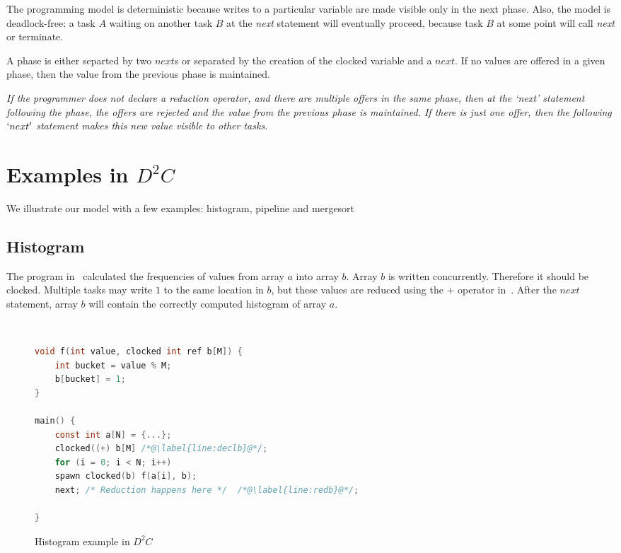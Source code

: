 \documentclass[10pt, conference, compsocconf]{IEEEtran}
\begin{document}
\begin{lstlisting}

\end{lstlisting}

The programming model is deterministic because writes to a particular variable
are made visible only in the next phase. Also, the model is deadlock-free: a task $A$ waiting on another task $B$ at the \emph{next} statement will eventually
proceed, because task $B$ at some point will call \emph{next} or terminate.

A phase is either separted by two $next$s or separated
by the creation of the clocked variable and a $next$.
If no values are offered in a given phase, then the value from
the previous phase is maintained.

{\it If the programmer does not declare a reduction operator, and there are multiple offers in the same phase, then  at the `next' statement following
the phase, the offers are rejected and the value from
the previous phase is maintained. If there is just one offer, then the following $`next'$ statement makes this new value visible to other tasks.}


\section{Examples in $D^2C$}
\label{sec:examples}
We illustrate our model with a few examples: 
histogram, pipeline and mergesort

\subsection{Histogram}
The program in~ calculated the frequencies
of values from array $a$ 
into array $b$.
Array $b$ is written concurrently. Therefore it should be clocked.
Multiple tasks may write $1$ to the same location in $b$, but these
values are reduced using the $+$ operator in~. After the 
$next$ statement, array $b$ will contain the correctly computed histogram
of array $a$. 

\
\begin{figure}
\begin{lstlisting}[language=C]
void f(int value, clocked int ref b[M]) {
    int bucket = value % M;
    b[bucket] = 1; 
}

main() {
    const int a[N] = {...};
    clocked((+) b[M] /*@\label{line:declb}@*/;
    for (i = 0; i < N; i++)
	spawn clocked(b) f(a[i], b); 
    next; /* Reduction happens here */  /*@\label{line:redb}@*/;

}
\end{lstlisting}
\caption{Histogram example in $D^2C$}
\label{fig:histogram}
\end{figure}
\end{document}
